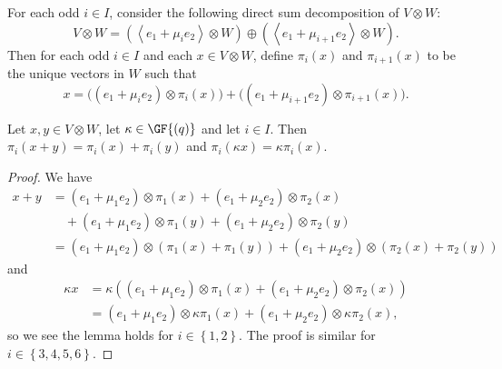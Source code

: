 \begin{defi} \label{def:projection-coordinates}
For each odd $i \in I$, consider the following direct sum decomposition of $V \otimes W$:
\begin{displaymath}
    V \otimes W = \left(\left<e_1 + \mu_i e_2 \right> \otimes W \right) \oplus {\left(\left<e_1 + \mu_{i+1} e_2 \right> \otimes W \right)}.
\end{displaymath}
Then for each odd $i \in I$ and each $x \in V \otimes W$, define $\pi_i{\left(x \right)}$ and $\pi_{i+1}{\left(x \right)}$ to be the unique vectors in $W$ such that
\begin{displaymath}
    x = \Big({\left(e_1 + \mu_i e_2 \right)} \otimes \pi_i{\left(x \right)} \Big) + \Big({\left(e_1 + \mu_{i+1} e_2 \right)} \otimes \pi_{i+1}{\left(x \right)}\Big).
\end{displaymath}
\end{defi}

\begin{lemma} \label{lm:projections-preserve-addition-and-multiplication}
Let $x, y \in V \otimes W$, let $\kappa \in \GF{\left(q \right)}$ and let $i \in I$. Then $\pi_i{\left(x + y \right)} = \pi_i{\left(x \right)} + \pi_i{\left(y \right)}$ and $\pi_i{\left(\kappa x \right)} = \kappa \pi_i{\left(x \right)}$.
\end{lemma}
\begin{proof}
We have
\begin{align*}
    x + y &= \left(e_1 + \mu_1 e_2 \right) \otimes \pi_1{\left(x \right)} + \left(e_1 + \mu_2 e_2 \right) \otimes \pi_2{\left(x \right)} \\
    & \quad + \left(e_1 + \mu_1 e_2 \right) \otimes \pi_1{\left(y \right)} + \left(e_1 + \mu_2 e_2 \right) \otimes \pi_2{\left(y \right)} \\
    &= \left(e_1 + \mu_1 e_2 \right) \otimes \left(\pi_1{\left(x \right)} + \pi_1{\left(y \right)}\right) + \left(e_1 + \mu_2 e_2 \right) \otimes \left(\pi_2{\left(x \right)} + \pi_2{\left(y \right)}\right)
\end{align*}
and
\begin{align*}
    \kappa x &= \kappa \left(\left(e_1 + \mu_1 e_2 \right) \otimes \pi_1{\left(x \right)} + \left(e_1 + \mu_2 e_2 \right) \otimes \pi_2{\left(x \right)}\right) \\
    &= \left(e_1 + \mu_1 e_2 \right) \otimes \kappa \pi_1{\left(x \right)} + \left(e_1 + \mu_2 e_2 \right) \otimes \kappa \pi_2{\left(x \right)},
\end{align*}
so we see the lemma holds for $i \in \left\{1, 2 \right\}$. The proof is similar for $i \in \left\{3, 4, 5, 6 \right\}$.
\end{proof}

